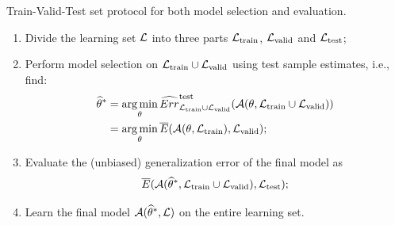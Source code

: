 \begin{algorithm}\label{algo:train-valid-test}
Train-Valid-Test set protocol for both model selection and evaluation.

\begin{enumerate}
\item Divide the learning set ${\cal L}$ into three parts
      ${\cal L}_\text{train}$, ${\cal L}_\text{valid}$ and ${\cal L}_\text{test}$;
\item Perform model selection on ${\cal L}_\text{train} \cup {\cal L}_\text{valid}$
      using test sample estimates, i.e., find:
      \begin{align}
      \widehat{\theta}^* &= \operatorname*{arg\,min}_{\theta} \widehat{Err}_{{\cal L}_\text{train} \cup {\cal L}_\text{valid}}^\text{test}({\cal A}(\theta, {\cal L}_\text{train} \cup {\cal L}_\text{valid})) \\
                         &= \operatorname*{arg\,min}_{\theta} \overline{E}({\cal A}(\theta, {\cal L}_\text{train}), {\cal L}_\text{valid});
      \end{align}
\item Evaluate the (unbiased) generalization error of the final model as
      \begin{equation}
      \overline{E}({\cal A}(\widehat{\theta}^*, {\cal L}_\text{train} \cup {\cal L}_\text{valid}), {\cal L}_\text{test});
      \end{equation}
\item Learn the final model ${\cal A}(\widehat{\theta}^*, {\cal L})$ on the entire learning set.
\end{enumerate}
\end{algorithm}

